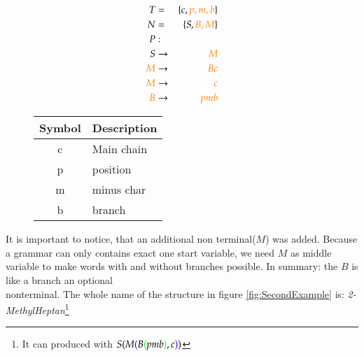 \documentclass[a4paper,10pt]{article}
\newcommand{\gerquot}[1]{\glqq#1\grqq}
\newcommand{\dashAndSpace}{\textendash \space}
\newcommand{\dashAndSpaceSeq}[1]{\dashAndSpace#1 \textendash}
\newcommand{\captionVSpace}{\vspace*{-0.05cm}}
\newcommand{\CFGDefinitionSize}{0.60}
\newcommand{\SymbolDescriptionTable}{0.35}
\newcommand{\colorBracketFirstNesting}{black}
\newcommand{\colorBracketSecondNesting}{blue}
\newcommand{\colorBracketThirdNesting}{green}
\newcommand{\colorNew}{orange}
\newcommand{\nonterminal}{non terminal}
\begin{document}
\begin{figure}[H]
    \begin{minipage}[l]{\CFGDefinitionSize\textwidth}
        $$
        \begin{aligned}
            T &=& \{c, {\color{\colorNew}p, m, b}\} \\
            N &=& \{S, {\color{\colorNew}B, M}\} \\
            P &:& \\
            S &\rightarrow& {\color{\colorNew}M} \\
            {\color{\colorNew}M} &\rightarrow& {\color{\colorNew}Bc} \\
            {\color{\colorNew}M} &\rightarrow& {\color{\colorNew}c} \\
            {\color{\colorNew}{B}} &\rightarrow& {\color{\colorNew}pmb} \\
        \end{aligned}
        $$
        \caption{CFG with exact one branch. $B \rightarrow pmb$ is an optional production rule.}
        \label{fig:CFGWithExactOneBranch}
    \end{minipage}
    \begin{minipage}[r]{\SymbolDescriptionTable\textwidth}
        \begin{table}[H]
        \centering
            \begin{tabular}{c|l}
                \toprule
                \textbf{Symbol} & \textbf{Description} \\
                \midrule
                c & Main chain \\
                p & position \\
                m & minus char \\
                b & branch \\
                \bottomrule
            \end{tabular}
        \end{table}
    \end{minipage}
\end{figure}

It is important to notice, that an additional \nonterminal ($M$) was added. Because a grammar can only contains exact one start variable, we need $M$ as \gerquot{middle variable} to make words with and without branches possible. In summary: the $B$ is \dashAndSpaceSeq{like a branch} an optional \\nonterminal.
The whole name of the structure in figure \ref{fig:SecondExample} is: \emph{2-MethylHeptan}\footnote{It can produced with
$
S
{\color{\colorBracketFirstNesting}{(}}
    M
    {\color{\colorBracketSecondNesting}{(}}
        B
        {\color{\colorBracketThirdNesting}{(}}
            pmb
        {\color{\colorBracketThirdNesting}{)}}
        , c
    {\color{\colorBracketSecondNesting}{)}}
{\color{\colorBracketFirstNesting}{)}}
$}
\end{document}
